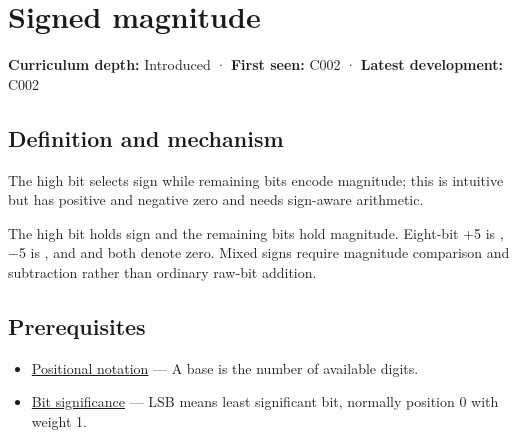 \hypertarget{appendix-ce20506c8532}{}\label{referencestart:appendix-ce20506c8532}
\section{Signed magnitude}\label{appendix-ce20506c8532-signed-magnitude}

\hypertarget{appendix-ce20506c8532-signed-magnitude}{}

\textbf{Curriculum depth:} Introduced · \textbf{First seen:} C002 · \textbf{Latest development:} C002

\begin{allmightroledefinition}

\subsection{Definition and mechanism}\label{appendix-ce20506c8532-definition-and-mechanism}

\hypertarget{appendix-ce20506c8532-definition-and-mechanism}{}

The high bit selects sign while remaining bits encode magnitude; this is intuitive but has positive and negative zero and needs sign-aware arithmetic.

\end{allmightroledefinition}

The high bit holds sign and the remaining bits hold magnitude. Eight-bit +5 is , −5 is , and  and  both denote zero. Mixed signs require magnitude comparison and subtraction rather than ordinary raw-bit addition.

\subsection{Prerequisites}\label{appendix-ce20506c8532-prerequisites}

\hypertarget{appendix-ce20506c8532-prerequisites}{}

\begin{itemize}
\tightlist
\item
  \hyperref[appendix-83c3f28f7bda]{Positional notation} --- A base is the number of available digits.
\item
  \hyperref[appendix-280445746493]{Bit significance} --- LSB means least significant bit, normally position 0 with weight 1.
\end{itemize}

